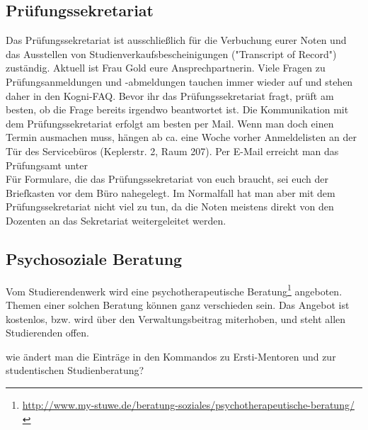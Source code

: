 \subsection*{Prüfungssekretariat}
Das Prüfungssekretariat ist ausschließlich für die Verbuchung eurer Noten und das Ausstellen von Studienverkaufsbescheinigungen ("Transcript of Record") zuständig. Aktuell ist Frau Gold eure Ansprechpartnerin. Viele Fragen zu Prüfungsanmeldungen und -abmeldungen tauchen immer wieder auf und stehen daher in den Kogni-FAQ. Bevor ihr das Prüfungssekretariat fragt, prüft am besten, ob die Frage bereits irgendwo beantwortet ist. Die Kommunikation mit dem Prüfungssekretariat erfolgt am besten per Mail. Wenn man doch einen Termin ausmachen muss, hängen ab ca. eine Woche vorher Anmeldelisten an der Tür des Servicebüros (Keplerstr. 2, Raum 207). Per E-Mail erreicht man das Prüfungsamt unter  \\
Für Formulare, die das Prüfungssekretariat von euch braucht, sei euch der Briefkasten vor dem Büro nahegelegt. Im Normalfall hat man aber mit dem Prüfungssekretariat nicht viel zu tun, da die Noten meistens direkt von den Dozenten an das Sekretariat weitergeleitet werden. 

\subsection*{Psychosoziale Beratung}
Vom Studierendenwerk wird eine psychotherapeutische Beratung\footnote{\url{http://www.my-stuwe.de/beratung-soziales/psychotherapeutische-beratung/}} angeboten. Themen einer solchen Beratung können ganz verschieden sein. Das Angebot ist kostenlos, bzw. wird über den Verwaltungsbeitrag miterhoben, und steht allen Studierenden offen.	%


wie ändert man die Einträge in den Kommandos zu Ersti-Mentoren und zur studentischen Studienberatung?
